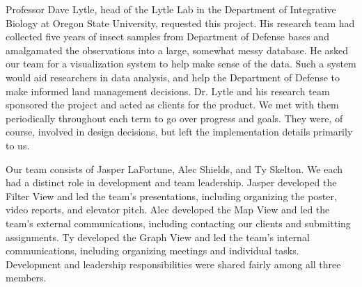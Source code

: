 Professor Dave Lytle, head of the Lytle Lab in the Department of Integrative Biology at Oregon State University, requested this project.
His research team had collected five years of insect samples from Department of Defense bases and amalgamated the observations into a large, somewhat messy database.
He asked our team for a visualization system to help make sense of the data.
Such a system would aid researchers in data analysis, and help the Department of Defense to make informed land management decisions.
Dr. Lytle and his research team sponsored the project and acted as clients for the product.
We met with them periodically throughout each term to go over progress and goals.
They were, of course, involved in design decisions, but left the implementation details primarily to us.

Our team consists of Jasper LaFortune, Alec Shields, and Ty Skelton.
We each had a distinct role in development and team leadership.
Jasper 	developed the Filter View 	and led the team's presentations, 			including organizing the poster, video reports, and elevator pitch.
Alec 	developed the Map View 		and led the team's external communications, including contacting our clients and submitting assignments.
Ty 		developed the Graph View 	and led the team's internal communications, including organizing meetings and individual tasks.
Development and leadership responsibilities were shared fairly among all three members.
